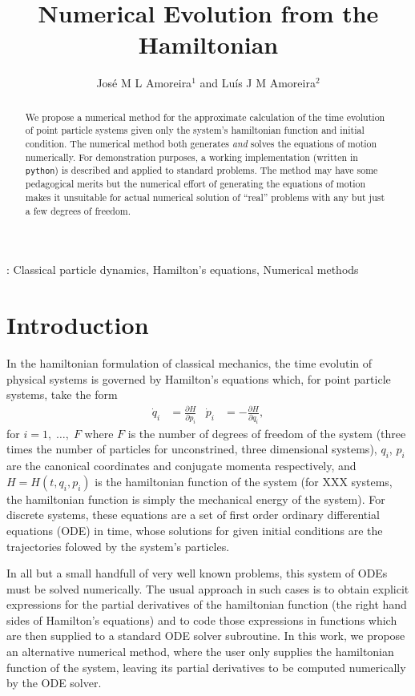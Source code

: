 \documentclass{iopart}
\newcommand{\pd}[2]{\frac{\partial#1}{\partial#2}}
\begin{document}
\title{Numerical Evolution from the Hamiltonian}
\author{José M L Amoreira$^1$ and Luís J M Amoreira$^2$}
\address{$^1$ Departamento de Física, Instituto Superior Técnico, Lisboa,
Portugal}
\address{$^2$ Departamento de Física, Universidade da Beira Interior, Covilhã,
Portugal}
\begin{abstract}
  We propose a numerical method for the approximate calculation of the time
  evolution of point particle systems given only the system's hamiltonian
  function and initial condition. The numerical method both generates \emph{and}
  solves the equations of motion numerically. For demonstration purposes, a
  working im\-ple\-men\-ta\-tion (written in \texttt{python}) is described and
  applied to standard problems. The method may have some pedagogical merits but
  the numerical effort of generating the equations of motion makes it unsuitable
  for actual numerical solution of ``real'' problems with any but just a few
  degrees of freedom.
\end{abstract}
: Classical particle dynamics,
Hamilton's equations,
Numerical methods

\submitto{\EJP}
\section{Introduction}
In the hamiltonian formulation of classical mechanics, the time evolutin of
physical systems is governed by Hamilton's equations which, for point particle
systems, take the form
\begin{align}
  \dot q_i&=\pd{H}{p_i}&
  \dot p_i&=-\pd{H}{q_i},
\end{align}
for $i=1,\;\ldots,\;F$ where $F$ is the number of degrees of freedom of the
system (three times the number of particles for unconstrined, three dimensional
systems), $q_i$, $p_i$ are the canonical coordinates and conjugate momenta
respectively, and $H=H(t, q_i, p_i)$ is the hamiltonian function of the system
(for XXX systems, the hamiltonian function is simply the mechanical energy of
the system). For discrete systems, these equations are a set of first order
ordinary differential equations (ODE) in time, whose solutions for given initial
conditions are the trajectories folowed by the system's particles.

In all but a small handfull of very well known problems, this system of ODEs
must be solved numerically. The usual approach in such cases is to obtain
explicit expressions for the partial derivatives of the hamiltonian function
(the right hand sides of Hamilton's equations) and to code those expressions in
functions which are then supplied to a standard ODE solver subroutine. In this
work, we propose an alternative numerical method, where the user only supplies
the hamiltonian function of the system, leaving its partial derivatives to be
computed numerically by the ODE solver.
\end{document}
